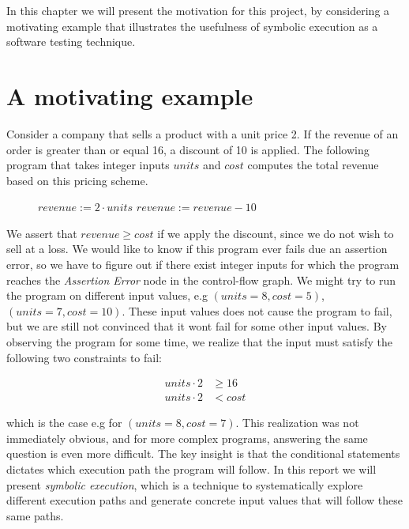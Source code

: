 In this chapter we will present the motivation for this project, by considering a motivating example that illustrates the usefulness of symbolic execution as a software testing technique.

\section{A motivating example}
Consider a company that sells a product with a unit price 2. If the revenue of an order is greater than or equal 16, a discount of 10 is applied. The following program that takes integer inputs $units$ and $cost$ computes the total revenue based on this pricing scheme. 


\begin{figure}[!h]
	\begin{algorithmic}[1]
		\State $revenue := 2\cdot units$
		\State $revenue := revenue - 10$
		\EndIf
		\State {}
		\EndProcedure
	\end{algorithmic}
\end{figure}

\motexample

\newpage

We assert that $revenue \geq cost$ if we apply the discount, since we do not wish to sell at a loss. 
We would like to know if this program ever fails due an assertion error, so we have to figure out if there exist integer inputs for which the program reaches the \textsl{Assertion Error} node in the control-flow graph. 
We might try to run the program on different input values, e.g $(units = 8, cost = 5)$, $(units = 7, cost = 10)$. These input values does not cause the program to fail, but we are still not convinced that it wont fail for some other input values.
By observing the program for some time, we realize that the input must satisfy the following two constraints to fail:

\begin{align*}
	 units \cdot 2 & \geq 16\\
	 units \cdot 2 & < cost
\end{align*}

which is the case e.g for $(units = 8, cost = 7)$. This realization was not immediately obvious, and for more complex programs, answering the same question is even more difficult. The key insight is that the conditional statements dictates which execution path the program will follow. In this report we will present \emph{symbolic execution}, which is a technique to systematically explore different execution paths and generate concrete input values that will follow these same paths. 